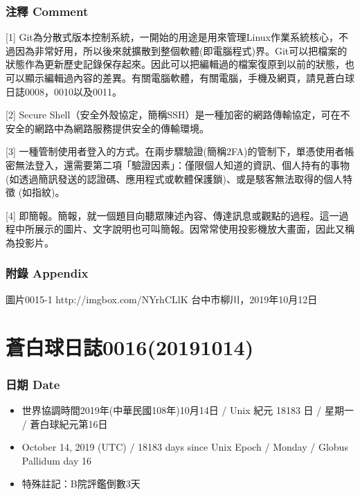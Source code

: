 \documentclass[a5paper, 12pt
]{book}
\providecommand{\tightlist}{%
  \setlength{\itemsep}{0pt}\setlength{\parskip}{0pt}}
\begin{document}
\hypertarget{ux6ce8ux91cb-comment-8}{%
\subsubsection{注釋 Comment}\label{ux6ce8ux91cb-comment-8}}

{[}1{]}
Git為分散式版本控制系統，一開始的用途是用來管理Linux作業系統核心，不過因為非常好用，所以後來就擴散到整個軟體(即電腦程式)界。Git可以把檔案的狀態作為更新歷史記錄保存起來。因此可以把編輯過的檔案復原到以前的狀態，也可以顯示編輯過內容的差異。有關電腦軟體，有關電腦，手機及網頁，請見蒼白球日誌0008，0010以及0011。

{[}2{]} Secure
Shell（安全外殼協定，簡稱SSH）是一種加密的網路傳輸協定，可在不安全的網路中為網路服務提供安全的傳輸環境。

{[}3{]}
一種管制使用者登入的方式。在兩步驟驗證(簡稱2FA)的管制下，單憑使用者帳密無法登入，還需要第二項「驗證因素」：僅限個人知道的資訊、個人持有的事物
(如透過簡訊發送的認證碼、應用程式或軟體保護鎖)、或是駭客無法取得的個人特徵
(如指紋)。

{[}4{]}
即簡報。簡報，就一個題目向聽眾陳述內容、傳達訊息或觀點的過程。這一過程中所展示的圖片、文字說明也可叫簡報。因常常使用投影機放大畫面，因此又稱為投影片。

\hypertarget{ux9644ux9304-appendix-7}{%
\subsubsection{附錄 Appendix}\label{ux9644ux9304-appendix-7}}

圖片0015-1 http://imgbox.com/NYrhCLlK 台中市柳川，2019年10月12日

\hypertarget{ux84bcux767dux7403ux65e5ux8a8c001620191014}{%
\section{蒼白球日誌0016(20191014)}\label{ux84bcux767dux7403ux65e5ux8a8c001620191014}}

\hypertarget{ux65e5ux671f-date-15}{%
\subsubsection{日期 Date}\label{ux65e5ux671f-date-15}}

\begin{itemize}
\tightlist
\item
  世界協調時間2019年(中華民國108年)10月14日 / Unix 紀元 18183 日 /
  星期一 / 蒼白球紀元第16日
\item
  October 14, 2019 (UTC) / 18183 days since Unix Epoch / Monday / Globus
  Pallidum day 16
\item
  特殊註記：B院評鑑倒數3天
\end{itemize}
\end{document}
